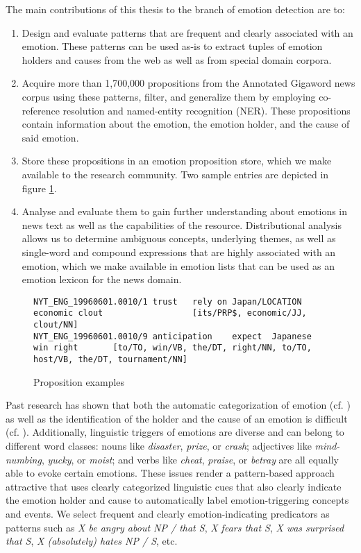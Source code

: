 The main contributions of this thesis to the branch of emotion detection are to:
\begin{enumerate}[noitemsep]
	\item Design and evaluate patterns that are frequent and clearly associated with an emotion. These patterns can be used as-is to extract tuples of emotion holders and causes from the web as well as from special domain corpora.
	\item Acquire more than 1,700,000 propositions from the Annotated Gigaword news corpus \cite{annotated_gigaword} using these patterns, filter, and generalize them by employing co-reference resolution and named-entity recognition (NER). These propositions contain information about the emotion, the emotion holder, and the cause of said emotion.
	\item Store these propositions in an emotion proposition store, which we make available to the research community. Two sample entries are depicted in figure \ref{fig:propositions}.
	\item Analyse and evaluate them to gain further understanding about emotions in news text as well as the capabilities of the resource. Distributional analysis allows us to determine ambiguous concepts, underlying themes, as well as single-word and compound expressions that are highly associated with an emotion, which we make available in emotion lists that can be used as an emotion lexicon for the news domain. 
\end{enumerate}

\begin{figure}
\begin{lstlisting}
NYT_ENG_19960601.0010/1	trust	rely on	Japan/LOCATION	economic clout					[its/PRP$, economic/JJ, clout/NN]
NYT_ENG_19960601.0010/9	anticipation	expect	Japanese				win	right		[to/TO, win/VB, the/DT, right/NN, to/TO, host/VB, the/DT, tournament/NN]
\end{lstlisting}
\caption{Proposition examples}\label{fig:propositions}
\end{figure}

Past research has shown that both the automatic categorization of emotion (cf. \cite{emotion_verbs}) as well as the identification of the holder and the cause of an emotion is difficult (cf. \cite{emotion_holder}). Additionally, linguistic triggers of emotions are diverse and can belong to different word classes: nouns like \textit{disaster}, \textit{prize}, or \textit{crash}; adjectives like \textit{mind-numbing}, \textit{yucky}, or \textit{moist}; and verbs like \textit{cheat}, \textit{praise}, or \textit{betray} are all equally able to evoke certain emotions. These issues render a pattern-based approach attractive that uses clearly categorized linguistic cues that also clearly indicate the emotion holder and cause to automatically label emotion-triggering concepts and events. We select frequent and clearly emotion-indicating predicators as patterns such as \textit{X be angry about NP / that S}, \textit{X fears that S}, \textit{X was surprised that S}, \textit{X (absolutely) hates NP / S}, etc.

